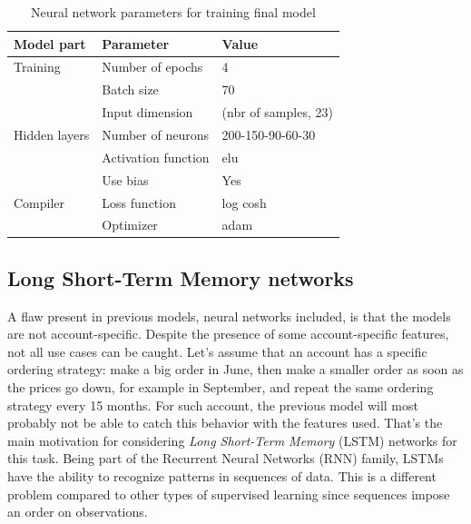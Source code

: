 \begin{table}[h]
    \centering
    \begin{tabular}{l|l|l}
        \textbf{Model part}           & \textbf{Parameter}                 & \textbf{Value}         \\ \hline
        Training                      & Number of epochs                   & 4                     \\
                                      & Batch size                         & 70             \\
                                      & Input dimension                    & (nbr of samples, 23)                     \\ \hline
        Hidden layers                 & Number of neurons                  & 200-150-90-60-30                     \\
                                      & Activation function                & elu                     \\
                                      & Use bias                           & Yes                     \\ \hline
        Compiler                      & Loss function                      & log cosh \\
                                      & Optimizer                          & adam
    \end{tabular}
    \caption{Neural network parameters for training final model}
    \label{tab:nn-final-parameters}
\end{table}


\subsection{Long Short-Term Memory networks}
A flaw present in previous models, neural networks included, is that the models are not account-specific. Despite the presence of some account-specific features, not all use cases can be caught. Let's assume that an account has a specific ordering strategy: make a big order in June, then make a smaller order as soon as the prices go down, for example in September, and repeat the same ordering strategy every 15 months. For such account, the previous model will most probably not be able to catch this behavior with the features used. That's the main motivation for considering \textit{Long Short-Term Memory} (LSTM) networks for this task. Being part of the Recurrent Neural Networks (RNN) family, LSTMs have the ability to recognize patterns in sequences of data. This is a different problem compared to other types of supervised learning since sequences impose an order on observations.


